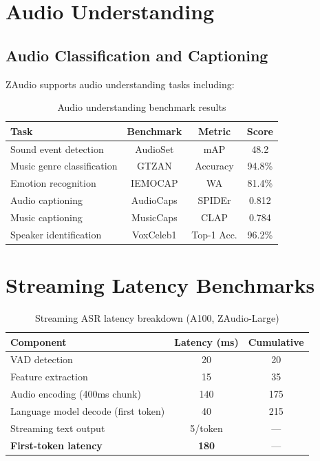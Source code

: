 \documentclass[11pt,a4paper]{article}
\begin{document}
\section{Audio Understanding}

\subsection{Audio Classification and Captioning}

ZAudio supports audio understanding tasks including:

\begin{table}[H]
\centering
\caption{Audio understanding benchmark results}
\label{tab:audio_understanding}
\begin{tabular}{lccc}
\toprule
Task & Benchmark & Metric & Score \\
\midrule
Sound event detection & AudioSet & mAP & 48.2 \\
Music genre classification & GTZAN & Accuracy & 94.8\% \\
Emotion recognition & IEMOCAP & WA & 81.4\% \\
Audio captioning & AudioCaps & SPIDEr & 0.812 \\
Music captioning & MusicCaps & CLAP & 0.784 \\
Speaker identification & VoxCeleb1 & Top-1 Acc. & 96.2\% \\
\bottomrule
\end{tabular}
\end{table}

\section{Streaming Latency Benchmarks}

\begin{table}[H]
\centering
\caption{Streaming ASR latency breakdown (A100, ZAudio-Large)}
\label{tab:latency}
\begin{tabular}{lcc}
\toprule
Component & Latency (ms) & Cumulative \\
\midrule
VAD detection & 20 & 20 \\
Feature extraction & 15 & 35 \\
Audio encoding (400ms chunk) & 140 & 175 \\
Language model decode (first token) & 40 & 215 \\
Streaming text output & 5/token & — \\
\midrule
\textbf{First-token latency} & \textbf{180} & — \\
\bottomrule
\end{tabular}
\end{table}
\end{document}
